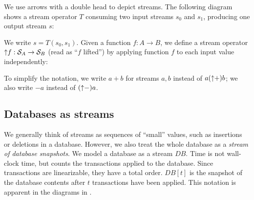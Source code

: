 We use arrows with a double head to depict streams.  The following
diagram shows a stream operator $T$ consuming two input streams $s_0$
and $s_1$, producing one output stream $s$:
%
\begin{center}
\vspace{-1ex}
\end{center}
%
We write $s = T(s_0, s_1)$.
Given a function $f: A \to B$, we define a stream operator ${\uparrow}f
:\mathcal{S}_{A} \to \mathcal{S}_{B}$ (read as ``$f$ lifted'') by applying
function $f$ to each input value independently:
\begin{center}
\end{center}
\vspace{-1ex}

To simplify the notation, we write $a + b$ for streams $a, b$ instead
of $a ({\uparrow}+) b$; we also write $-a$ instead of $({\uparrow}-)a$.

\subsection{Databases as streams}

We generally think of streams as sequences of ``small'' values, such
as insertions or deletions in a database.  However, we also treat the
whole database as a \emph{stream of database snapshots}.  We model a
database as a stream $DB$.  Time is not wall-clock time, but counts
the transactions applied to the database.  Since transactions are
linearizable, they have a total order.  $DB[t]$ is the snapshot of the
database contents after $t$ transactions have been applied.  This
notation is apparent in the diagrams in .

